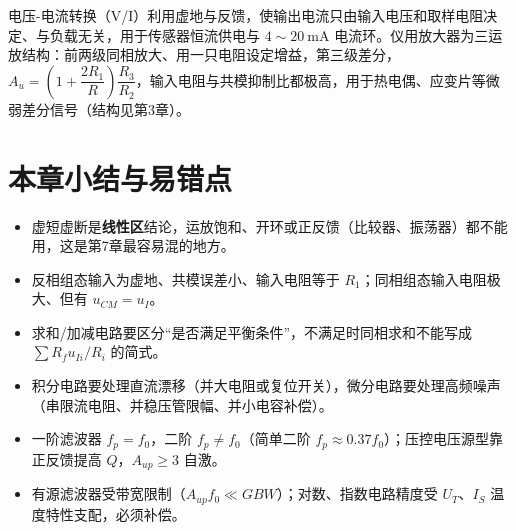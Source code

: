 电压-电流转换（V/I）利用虚地与反馈，使输出电流只由输入电压和取样电阻决定、与负载无关，用于传感器恒流供电与 $4\sim20\ \mathrm{mA}$ 电流环。仪用放大器为三运放结构：前两级同相放大、用一只电阻设定增益，第三级差分，$A_u=\left(1+\dfrac{2R_1}{R}\right)\dfrac{R_3}{R_2}$，输入电阻与共模抑制比都极高，用于热电偶、应变片等微弱差分信号（结构见第3章）。

\section{本章小结与易错点}
\begin{itemize}
    \item 虚短虚断是\textbf{线性区}结论，运放饱和、开环或正反馈（比较器、振荡器）都不能用，这是第7章最容易混的地方。
    \item 反相组态输入为虚地、共模误差小、输入电阻等于 $R_1$；同相组态输入电阻极大、但有 $u_{CM}=u_I$。
    \item 求和/加减电路要区分“是否满足平衡条件”，不满足时同相求和不能写成 $\sum R_f u_{Ii}/R_i$ 的简式。
    \item 积分电路要处理直流漂移（并大电阻或复位开关），微分电路要处理高频噪声（串限流电阻、并稳压管限幅、并小电容补偿）。
    \item 一阶滤波器 $f_p=f_0$，二阶 $f_p\neq f_0$（简单二阶 $f_p\approx0.37f_0$）；压控电压源型靠正反馈提高 $Q$，$A_{up}\ge3$ 自激。
    \item 有源滤波器受带宽限制（$A_{up}f_0\ll GBW$）；对数、指数电路精度受 $U_T$、$I_S$ 温度特性支配，必须补偿。
\end{itemize}
